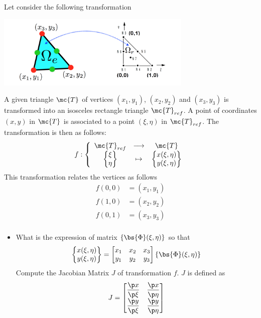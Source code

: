 
\bexo
Let consider the following transformation\\
 \begin{center}
 \includegraphics[width=0.7\textwidth]{../TeX_Files/Calculus/reference_element.png}
 \end{center}
 A given triangle $\mc{T}$ of vertices $(x_1,y_1)$, $(x_2,y_2)$ and $(x_3,y_3)$ is transformed into an isosceles rectangle triangle $\mc{T}_{ref}$. A point of coordinates $(x,y)$ in $\mc{T}$ is associated to a point $(\xi,\eta)$ in $\mc{T}_{ref}$. The transformation is then as follows:
 \begin{equation}
 f:\left\{
 \begin{array}{ccc}
 	\mc{T}_{ref} &\longrightarrow &\mc{T}\\
 	\begin{Bmatrix}
 		\xi\\\eta
 	\end{Bmatrix}
 	&\mapsto & 	\begin{Bmatrix}
 		x(\xi,\eta)\\
 		y(\xi,\eta)
 		 	\end{Bmatrix}
 \end{array}
 \right.	
 \end{equation}
This transformation relates the vertices as follows
\begin{align}
	f(0,0)&=(x_1,y_1)\\
	f(1,0)&=(x_2,y_2)\\
	f(0,1)&=(x_3,y_3)\\
\end{align} 
 

 \begin{itemize}
 	\item What is the expression of matrix $\{\bs{\Phi}(\xi,\eta)\}$ so that 
 \begin{equation}
 	\begin{Bmatrix}
 		x(\xi,\eta)\\
 		y(\xi,\eta)
 		 	\end{Bmatrix}=\begin{bmatrix}
 		 		x_1 & x_2 & x_3\\
 		 		y_1 & y_2 & y_3
 		 	\end{bmatrix}\{\bs{\Phi}(\xi,\eta)\}
 \end{equation}
 Compute the Jacobian Matrix $J$ of transformation $f$. $J$ is defined as 
 \begin{equation}
 	J=\begin{bmatrix}
 		\dfrac{\p x}{\p \xi} & \dfrac{\p x}{\p \eta}\\
 		\dfrac{\p y}{\p \xi} & \dfrac{\p y}{\p \eta}
 	\end{bmatrix}
 \end{equation} 
 \end{itemize}
  
